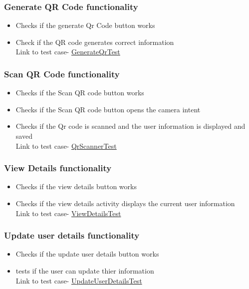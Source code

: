 \documentclass[english]{article}
\begin{document}
		\subsubsection{Generate QR Code functionality}
			\begin{itemize} 
				\item Checks if the generate Qr Code button works
				\item Check if the QR code generates correct information
				\\	Link to test case-
					\href{https://github.com/XoloKDandashe/Alpha-Tech/blob/master/Code/NFCBusinessCardLocal2/app/src/androidTest/java/com/example/www/nfcbusinesscardlocal/GenerateQRCodeTest.java}{GenerateQrTest}

			\end{itemize}
	\subsubsection{Scan QR Code functionality}
			\begin{itemize} 
				\item Checks if the Scan QR code button works
				\item Checks if the Scan QR code button opens the camera intent
				\item Checks if the Qr code is scanned and the user information is displayed and saved
\\	Link to test case-
					\href{https://github.com/XoloKDandashe/Alpha-Tech/blob/master/Code/NFCBusinessCardLocal2/app/src/androidTest/java/com/example/www/nfcbusinesscardlocal/QrScannerTest.java}{QrScannerTest}
			\end{itemize}
		\subsubsection{View Details functionality}
			\begin{itemize} 
				\item Checks if the view details button works
				\item Checks if the view details activity displays the current user information
\\Link to test case-
					\href{https://github.com/XoloKDandashe/Alpha-Tech/blob/master/Code/NFCBusinessCardLocal2/app/src/androidTest/java/com/example/www/nfcbusinesscardlocal/ViewUserDetailsTest.java}{ViewDetailsTest}
			\end{itemize}
		\subsubsection{Update user details functionality}
			\begin{itemize} 
				\item Checks if the update user details button works
				\item tests if the user can update thier information
\\	Link to test case-
					\href{https://github.com/XoloKDandashe/Alpha-Tech/blob/master/Code/NFCBusinessCardLocal2/app/src/androidTest/java/com/example/www/nfcbusinesscardlocal/UpdateUserDetailsTest.java}{UpdateUserDetailsTest}
			\end{itemize}
\end{document}
